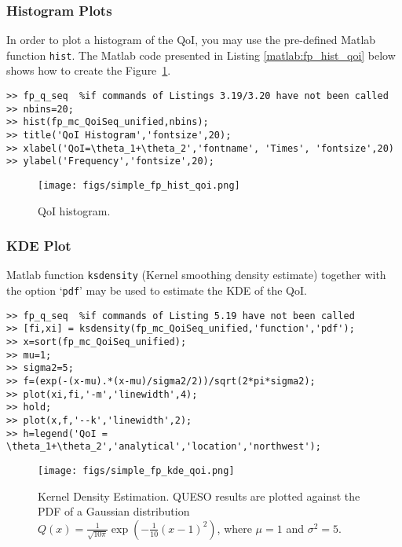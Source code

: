 \subsubsection{Histogram Plots}

In order to plot a histogram of the QoI, you may use the pre-defined Matlab function \verb+hist+.
The Matlab code presented in Listing \ref{matlab:fp_hist_qoi} below shows how to create the Figure~\ref{fig:fp_qoi_hist}.

\begin{lstlisting}[label=matlab:fp_hist_qoi,caption={Matlab code for the QoI histogram plot.}]
% inside Matlab
>> fp_q_seq  %if commands of Listings 3.19/3.20 have not been called
>> nbins=20;
>> hist(fp_mc_QoiSeq_unified,nbins);
>> title('QoI Histogram','fontsize',20);
>> xlabel('QoI=\theta_1+\theta_2','fontname', 'Times', 'fontsize',20)
>> ylabel('Frequency','fontsize',20);
\end{lstlisting}

\begin{figure}[p]
\centering 
\texttt{[image: figs/simple\_fp\_hist\_qoi.png]}
\vspace{-10pt}
\caption{QoI histogram.}
\label{fig:fp_qoi_hist}
\end{figure}

\subsubsection{KDE Plot}

Matlab function \verb+ksdensity+ (Kernel smoothing density estimate) together with the option `\verb+pdf+' may be used to estimate the KDE of the QoI. 

\begin{lstlisting}[label=matlab:fp_kde_qoi,caption={Matlab code for the KDE displayed in Figure \ref{fig:simple_sfp_kde}}]
% inside Matlab
>> fp_q_seq  %if commands of Listing 5.19 have not been called
>> [fi,xi] = ksdensity(fp_mc_QoiSeq_unified,'function','pdf');
>> x=sort(fp_mc_QoiSeq_unified);
>> mu=1;
>> sigma2=5;
>> f=(exp(-(x-mu).*(x-mu)/sigma2/2))/sqrt(2*pi*sigma2);
>> plot(xi,fi,'-m','linewidth',4);
>> hold;
>> plot(x,f,'--k','linewidth',2);
>> h=legend('QoI = \theta_1+\theta_2','analytical','location','northwest');
\end{lstlisting}


\begin{figure}[p]
\centering 
\texttt{[image: figs/simple\_fp\_kde\_qoi.png]}
\vspace{-10pt}
\caption{Kernel Density Estimation. QUESO results are plotted against the PDF of a Gaussian distribution $Q(x)=   \frac{1}{ \sqrt{10\pi}} \exp\left(-\frac{1}{10}(x-1)^2 \right)$, where $\mu=1$ and $\sigma^2=5$.}
\label{fig:simple_sfp_kde}
\end{figure}


